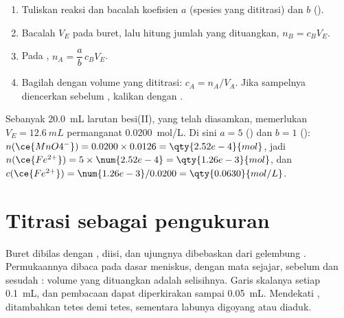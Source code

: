 \begin{method}\label{met:g11:titration:computing}
\begin{enumerate}
  \item Tuliskan  reaksi  dan bacalah
        koefisien $a$ (spesies yang dititrasi) dan $b$ ().
  \item Bacalah $V_E$ pada buret, lalu hitung jumlah  yang
        dituangkan, $n_B = c_B V_E$.
  \item Pada , $n_A = \dfrac{a}{b}\, c_B V_E$.
  \item Bagilah dengan volume yang dititrasi: $c_A = n_A / V_A$. Jika
        sampelnya diencerkan sebelum , kalikan dengan .
\end{enumerate}
\end{method}

\begin{example}\label{ex:g11:titration:iron}
Sebanyak \qty{20.0}{mL} larutan besi(II), yang telah diasamkan,
memerlukan $V_E = \qty{12.6}{mL}$ permanganat \qty{0.0200}{mol/L}. Di
sini $a = 5$ () dan $b = 1$ ():
$n(\ce{MnO4^-}) = 0.0200 \times 0.0126 = \qty{2.52e-4}{mol}$, jadi
$n(\ce{Fe^{2+}}) = 5 \times \num{2.52e-4} = \qty{1.26e-3}{mol}$, dan
$c(\ce{Fe^{2+}}) = \num{1.26e-3} / 0.0200 = \qty{0.0630}{mol/L}$.
\end{example}

\section{Titrasi sebagai pengukuran}

\begin{inthelab}
Buret dibilas dengan , diisi, dan ujungnya dibebaskan dari
gelembung . Permukaannya dibaca pada dasar meniskus, dengan mata
sejajar, sebelum dan sesudah : volume yang dituangkan adalah
selisihnya. Garis skalanya setiap \qty{0.1}{mL}, dan pembacaan dapat
diperkirakan sampai \qty{0.05}{mL}. Mendekati , 
ditambahkan tetes demi tetes, sementara labunya digoyang atau diaduk.
\end{inthelab}


